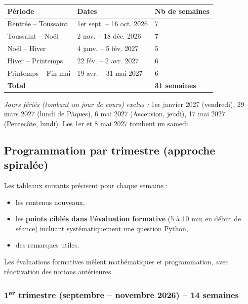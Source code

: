\documentclass[a4paper,12pt]{article}
\begin{document}
	\begin{center}
		\begin{tabular}{|C{3.5cm}|C{5cm}|C{2.5cm}|}
			\hline
			\textbf{Période} & \textbf{Dates} & \textbf{Nb de semaines} \\
			\hline
			Rentrée – Toussaint & 1er sept. – 16 oct. 2026 & 7 \\
			Toussaint – Noël & 2 nov. – 18 déc. 2026 & 7 \\
			Noël – Hiver & 4 janv. – 5 fév. 2027 & 5 \\
			Hiver – Printemps & 22 fév. – 2 avr. 2027 & 6 \\
			Printemps – Fin mai & 19 avr. – 31 mai 2027 & 6 \\
			\hline
			\textbf{Total} & & \textbf{31 semaines} \\
			\hline
		\end{tabular}
	\end{center}
	
	\textit{Jours fériés (tombant un jour de cours) exclus :} 1er janvier 2027 (vendredi), 29 mars 2027 (lundi de Pâques), 6 mai 2027 (Ascension, jeudi), 17 mai 2027 (Pentecôte, lundi). Les 1er et 8 mai 2027 tombent un samedi.
	
	\subsection{Programmation par trimestre (approche spiralée)}
	Les tableaux suivants précisent pour chaque semaine :
	\begin{itemize}
		\item les contenus nouveaux,
		\item les \textbf{points ciblés dans l’évaluation formative} (5 à 10 min en début de séance) incluant systématiquement une question Python,
		\item des remarques utiles.
	\end{itemize}
	Les évaluations formatives mêlent mathématiques et programmation, avec réactivation des notions antérieures.
	
	\newpage
	\subsubsection{1\textsuperscript{er} trimestre (septembre – novembre 2026) – 14 semaines}
	
\end{document}
